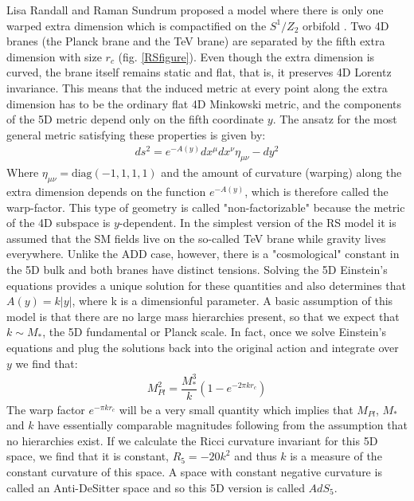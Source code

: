 Lisa Randall and Raman Sundrum proposed a model where there is only one warped extra dimension which is compactified on the $S^{1}/Z_{2}$ orbifold \cite{Randall:1999ee,Randall:1999vf}. Two 4D branes (the Planck brane and the TeV brane) are separated by the fifth extra dimension with size $r_{c}$ (fig. \ref{RSfigure}). Even though the extra dimension is curved, the brane itself remains static and flat, that is, it preserves 4D Lorentz invariance. This means that the induced metric at every point along the extra dimension has to be the ordinary flat 4D Minkowski metric, and the components of the 5D metric depend only on the fifth coordinate $y$. The ansatz for the most general metric satisfying these properties is given by:
\begin{eqnarray}
ds^{2}= e^{-A(y)} dx^{\mu}dx^{\nu} \eta_{\mu\nu} - dy^{2} 
\end{eqnarray}
Where $\eta_{\mu\nu}=\text{diag}(-1,1,1,1)$ and the amount of curvature (warping) along the extra dimension depends on the function $e^{-A(y)}$, which is therefore called the warp-factor. This
type of geometry is called "non-factorizable" because the metric of the 4D subspace is $y$-dependent.
In the simplest version of the RS model it is assumed that the SM fields live on the so-called TeV brane while gravity lives everywhere. Unlike the ADD case, however, there is a "cosmological" constant in the 5D bulk and both branes have distinct tensions. Solving the 5D Einstein’s equations provides a unique solution for these quantities and also determines that $A(y) = k\left| y \right| $, where k is a dimensionful parameter. A basic assumption of this model is that there are no large mass hierarchies present, so that we expect that $k \sim M_{*}$, the 5D fundamental or Planck scale. In fact, once we solve Einstein’s equations and plug the solutions back into the original action and integrate over $y$ we find that:
\begin{eqnarray}
M_{Pl}^{2} = \dfrac{M_{*}^{3}}{k}\left(1-e^{-2\pi k r_{c}} \right)  
\end{eqnarray}
The warp factor $e^{-\pi k r_{c}}$ will be a very small quantity which implies that $M_{Pl}$, $M_{*}$ and $k$ have essentially comparable magnitudes following from the assumption that no hierarchies exist. If we calculate the Ricci
curvature invariant for this 5D space, we find that it is  constant, $ R_{5} = - 20 k^{2}$ and thus $k$ is a measure of the
constant curvature of this space. A space with constant negative curvature is called an Anti-DeSitter space and so this 5D version is called $AdS_{5}$.
